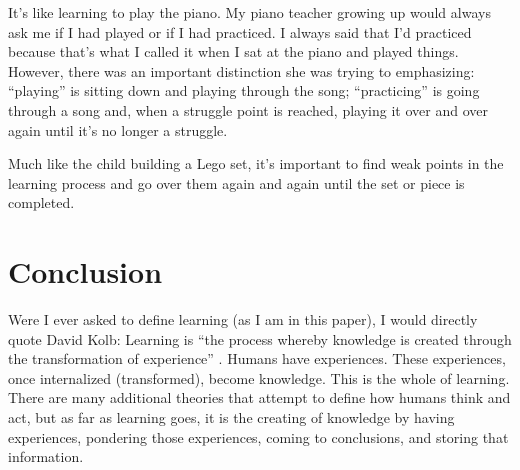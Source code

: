 \documentclass[man,natbib]{apa6}
\begin{document}
It's like learning to play the piano. My piano teacher growing up would always ask me if I had played or if I had practiced. I always said that I'd practiced because that's what I called it when I sat at the piano and played things. However, there was an important distinction she was trying to emphasizing: ``playing'' is sitting down and playing through the song; ``practicing'' is going through a song and, when a struggle point is reached, playing it over and over again until it's no longer a struggle.

Much like the child building a Lego set, it's important to find weak points in the learning process and go over them again and again until the set or piece is completed.

\section{Conclusion}
Were I ever asked to define learning (as I am in this paper), I would directly quote David Kolb: Learning is ``the process whereby knowledge is created through the transformation of experience'' \citep{kolb2014experiential}. Humans have experiences. These experiences, once internalized (transformed), become knowledge. This is the whole of learning. There are many additional theories that attempt to define how humans think and act, but as far as learning goes, it is the creating of knowledge by having experiences, pondering those experiences, coming to conclusions, and storing that information.


\end{document}
